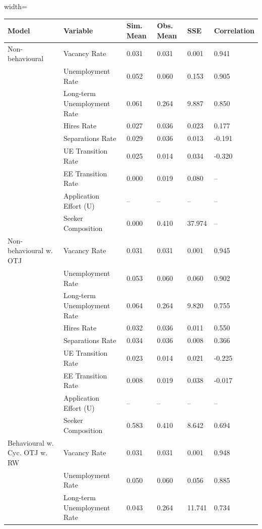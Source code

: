 \begin{table}[ht]
\centering
\begin{adjustbox}{width=\textwidth}
\begin{tabular}{llllll}
\toprule
Model & Variable & Sim. Mean & Obs. Mean & SSE & Correlation \\
\midrule
Non-behavioural & Vacancy Rate & 0.031 & 0.031 & \cellcolor{yellow!25}0.001 & \cellcolor{yellow!25}0.941 \\
 & Unemployment Rate & 0.052 & 0.060 & 0.153 & \cellcolor{black!30}0.905 \\
 & Long-term Unemployment Rate & 0.061 & 0.264 & 9.887 & \cellcolor{red!25}0.850 \\
 & Hires Rate & 0.027 & 0.036 & 0.023 & 0.177 \\
 & Separations Rate & 0.029 & 0.036 & 0.013 & -0.191 \\
 & UE Transition Rate & 0.025 & 0.014 & 0.034 & -0.320 \\
 & EE Transition Rate & 0.000 & 0.019 & 0.080 & -- \\
 & Application Effort (U) & -- & -- & -- & -- \\
 & Seeker Composition & 0.000 & 0.410 & 37.974 & -- \\
Non-behavioural w. OTJ & Vacancy Rate & 0.031 & 0.031 & \cellcolor{yellow!25}0.001 & \cellcolor{yellow!25}0.945 \\
 & Unemployment Rate & 0.053 & 0.060 & 0.060 & \cellcolor{black!30}0.902 \\
 & Long-term Unemployment Rate & 0.064 & 0.264 & 9.820 & 0.755 \\
 & Hires Rate & 0.032 & 0.036 & 0.011 & 0.550 \\
 & Separations Rate & 0.034 & 0.036 & 0.008 & 0.366 \\
 & UE Transition Rate & 0.023 & 0.014 & 0.021 & -0.225 \\
 & EE Transition Rate & 0.008 & 0.019 & 0.038 & -0.017 \\
 & Application Effort (U) & -- & -- & -- & -- \\
 & Seeker Composition & 0.583 & 0.410 & 8.642 & \cellcolor{yellow!25}0.694 \\
Behavioural w. Cyc. OTJ w. RW & Vacancy Rate & 0.031 & 0.031 & \cellcolor{yellow!25}0.001 & \cellcolor{yellow!25}0.948 \\
 & Unemployment Rate & 0.050 & 0.060 & 0.056 & \cellcolor{black!30}0.885 \\
 & Long-term Unemployment Rate & 0.043 & 0.264 & 11.741 & 0.734 \\

\end{tabular}
\end{adjustbox}
\end{table}
